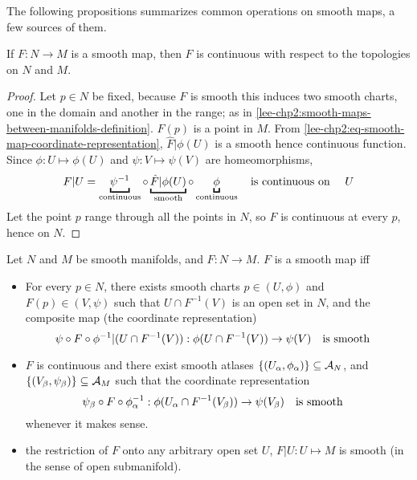 \documentclass[../main-manifolds.tex]{subfiles}
\begin{document}
The following propositions summarizes common operations on smooth maps, a few sources of them.
\begin{wts}\label{lee-chp2:smooth-maps-are-continuous}
    If $F:N\to M$ is a smooth map, then $F$ is continuous with respect to the topologies on $N$ and $M$.
\end{wts}
\begin{proof}
    Let $p\in N$ be fixed, because $F$ is smooth this induces two smooth charts, one in the domain and another in the range; as in \cref{lee-chp2:smooth-maps-between-manifolds-definition}. $F(p)$ is a point in $M$. From \cref{lee-chp2:eq-smooth-map-coordinate-representation}, $\hat{F}|\phi(U)$ is a smooth hence continuous function. Since $\phi: U\mapsto \phi(U)$ and $\psi: V\mapsto \psi(V)$ are homeomorphisms, 
    \[
        F|U = \underbracket{\psi^{-1}}_{\text{continuous}}\circ \underbracket{\hat{F}|\phi(U)}_{\text{smooth}}\circ \underbracket{\phi}_{\text{continuous}}\qq{is continuous on }U
    \]
    Let the point $p$ range through all the points in $N$, so $F$ is continuous at every $p$, hence on $N$.
\end{proof}
\begin{wts}\label{lee-chp2:characterizations-of-smooth-maps}
    Let $N$ and $M$ be smooth manifolds, and $F:N\to M$. $F$ is a smooth map iff
    \begin{itemize}
        \item For every $p\in N$, there exists smooth charts $p\in (U,\phi)$ and $F(p)\in (V,\psi)$ such that $U\cap F^{-1}(V)$ is an open set in $N$, and the composite map (the coordinate representation)
        \[
            \psi\circ F\circ \phi^{-1}|(U\cap F^{-1}(V)):\phi(U\cap F^{-1}(V))\to \psi(V)\qq{is smooth}
        \]
        \item $F$ is continuous and there exist smooth atlases $\{(U_\alpha,\phi_\alpha)\}\subseteq\mathcal{A}_N$, and $\{(V_\beta,\psi_\beta)\}\subseteq\mathcal{A}_M$ such that the coordinate representation 
        \[
            \psi_\beta\circ F\circ \phi_\alpha^{-1}:\phi(U_\alpha\cap F^{-1}(V_\beta))\to \psi(V_\beta)\qq{is smooth}
        \]
        whenever it makes sense.
        \item the restriction of $F$ onto any arbitrary open set $U$, $F|U: U\mapsto M$ is smooth (in the sense of open submanifold).
    \end{itemize}
\end{wts}
\end{document}
